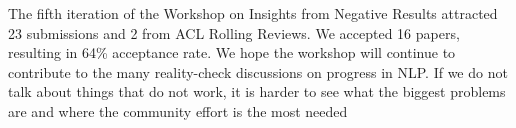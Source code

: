 \documentclass[11pt,oneside]{book}
\begin{document}
The fifth iteration of the Workshop on Insights from Negative Results attracted 23 submissions and 2 from
ACL Rolling Reviews.
We accepted 16 papers, resulting in  64\% acceptance rate.
We hope the workshop will continue to contribute to the many reality-check discussions on progress in
NLP. If we do not talk about things that do not work, it is harder to see what the biggest problems are
and where the community effort is the most needed
  \newpage






\end{document}
